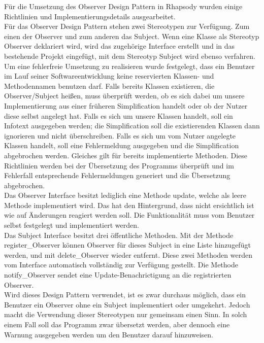 Für die Umsetzung des Observer Design Pattern in Rhapsody wurden einige Richtlinien und 
Implementierungsdetails ausgearbeitet.\\
\newline
Für das Observer Design Pattern stehen zwei Stereotypen zur Verfügung. Zum einen der Observer 
und zum anderen das Subject. Wenn eine Klasse als Stereotyp Observer deklariert wird, wird das 
zugehörige Interface erstellt und in das bestehende Projekt eingefügt, mit dem Stereotyp Subject 
wird ebenso verfahren.\\
\newline
Um eine fehlerfreie Umsetzung zu realisieren wurde festgelegt, dass ein Benutzer im Lauf seiner 
Softwareentwicklung keine reservierten Klassen- und Methodennamen benutzen darf. Falls bereits Klassen existieren, die Observer/Subject heißen, muss überprüft werden, ob es sich dabei um unsere Implementierung aus einer früheren Simplification handelt oder ob der Nutzer diese selbst angelegt hat. Falls es sich um unsere Klassen handelt, soll ein Infotext ausgegeben werden; die Simplification soll die existierenden Klassen dann ignorieren und nicht überschreiben. Falls es sich um vom Nutzer angelegte Klassen handelt, soll eine Fehlermeldung ausgegeben und die Simplification abgebrochen werden.
Gleiches gilt für bereits implementierte Methoden. 
Diese Richtlinien werden bei der Übersetzung des Programms überprüft und im Fehlerfall 
entsprechende Fehlermeldungen generiert und die Übersetzung abgebrochen.\\
\newline
Das Observer Interface besitzt lediglich eine Methode update, welche als leere Methode 
implementiert wird. Das hat den Hintergrund, dass nicht ersichtlich ist wie auf Änderungen 
reagiert werden soll. Die Funktionalität muss vom Benutzer selbst festgelegt und implementiert 
werden.\\
\newline
Das Subject Interface besitzt drei öffentliche Methoden. Mit der Methode register_Observer 
können Observer für dieses Subject in eine Liste hinzugefügt werden, und mit delete_Observer 
wieder entfernt. Diese zwei Methoden werden vom Interface automatisch vollständig zur Verfügung
gestellt. Die Methode notify_Observer sendet eine Update-Benachrictigung an die registrierten Observer.\\
\newline
Wird dieses Design Pattern verwendet, ist es zwar durchaus möglich, dass ein Benutzer ein 
Observer ohne ein Subject implementiert oder umgekehrt. Jedoch macht die Verwendung 
dieser Stereotypen nur gemeinsam einen Sinn. In solch einem Fall soll das Programm zwar 
übersetzt werden, aber dennoch eine Warnung ausgegeben werden um den Benutzer darauf hinzuweisen.

						